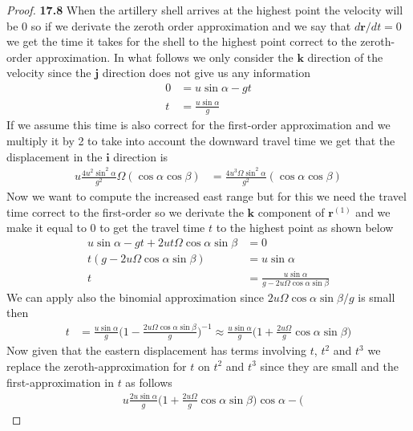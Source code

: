 \documentclass[11pt]{article}
\theoremstyle{definition}
\begin{document}
\begin{proof}{\textbf{17.8}}
    When the artillery shell arrives at the highest point the velocity will be
    $0$ so if we derivate the zeroth order approximation and we say that
    $d\bm{r}/dt = 0$ we get the time it takes for the shell to 
    the highest point correct to the zeroth-order approximation.
    In what follows we only consider the $\bm{k}$ direction of the velocity
    since the $\bm{j}$ direction does not give us any information 
    \begin{align*}
        0 &= u\sin\alpha - gt\\
        t &= \frac{u\sin\alpha}{g}
    \end{align*}
    If we assume this time is also correct for the first-order approximation
    and we multiply it by 2 to take into account the downward travel time we
    get that the displacement in the $\bm{i}$ direction is
    \begin{align*}
        u\frac{4u^2\sin^2\alpha}{g^2}\Omega(\cos\alpha\cos\beta) &=
        \frac{4u^3\Omega\sin^2\alpha}{g^2}(\cos\alpha\cos\beta)
    \end{align*}
    Now we want to compute the increased east range 
    but for this we need the travel time correct to the first-order so
    we derivate the $\bm{k}$ component of $\bm{r}^{(1)}$ and we make it equal
    to 0 to get the travel time $t$ to the highest point as shown below
    \begin{align*}
        u\sin\alpha - gt + 2ut\Omega\cos\alpha\sin\beta &= 0\\
        t(g - 2u\Omega\cos\alpha\sin\beta) &= u\sin\alpha\\
        t &= \frac{u\sin\alpha}{g - 2u\Omega\cos\alpha\sin\beta}
    \end{align*}
    We can apply also the binomial approximation since
    $2u\Omega\cos\alpha\sin\beta/g$ is small then
    \begin{align*}
        t &= \frac{u\sin\alpha}{g}
        \bigg(1 - \frac{2u\Omega\cos\alpha\sin\beta}{g}\bigg)^{-1}
        \approx \frac{u\sin\alpha}{g}
        \bigg(1 + \frac{2u\Omega}{g}\cos\alpha\sin\beta\bigg)
    \end{align*}
    Now given that the eastern displacement has terms involving $t$, $t^2$ and
    $t^3$ we replace the zeroth-approximation for $t$ on $t^2$ and $t^3$ since
    they are small and the first-approximation in $t$ as follows
    \begin{align*}
        &u\frac{2u\sin\alpha}{g}
        \bigg(1 + \frac{2u\Omega}{g}\cos\alpha\sin\beta\bigg)
        \cos\alpha
        - \bigg(

\end{align*}
\end{proof}
\end{document}
